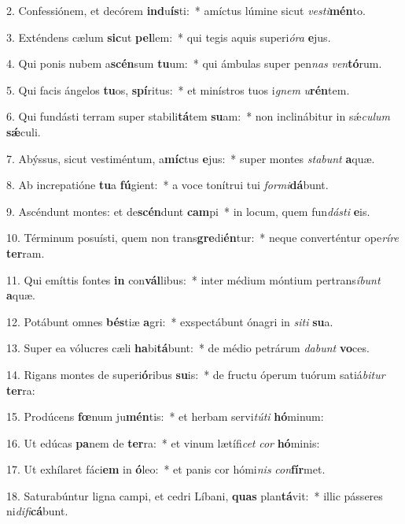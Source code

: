 2. Confessiónem, et decórem \textbf{ind}u\textbf{ís}ti:~*  amíctus lúmine sicut \textit{ves}\textit{ti}\textbf{mén}to.\

3. Exténdens cælum \textbf{sic}ut \textbf{pel}lem:~*  qui tegis aquis superi\textit{ó}\textit{ra} \textbf{e}jus.\

4. Qui ponis nubem a\textbf{scén}sum \textbf{tu}um:~*  qui ámbulas super pen\textit{nas} \textit{ven}\textbf{tó}rum.\

5. Qui facis ángelos \textbf{tu}os, \textbf{spí}ritus:~*  et minístros tuos i\textit{gnem} \textit{u}\textbf{rén}tem.\

6. Qui fundásti terram super stabili\textbf{tá}tem \textbf{su}am:~*  non inclinábitur in sǽ\textit{cu}\textit{lum} \textbf{sǽ}culi.\

7. Abýssus, sicut vestiméntum, a\textbf{míc}tus \textbf{e}jus:~*  super montes \textit{sta}\textit{bunt} \textbf{a}quæ.\

8. Ab increpatióne \textbf{tu}a \textbf{fú}gient:~*  a voce tonítrui tui \textit{for}\textit{mi}\textbf{dá}bunt.\

9. Ascéndunt montes: et de\textbf{scén}dunt \textbf{cam}pi~*  in locum, quem fun\textit{dás}\textit{ti} \textbf{e}is.\

10. Términum posuísti, quem non trans\textbf{gre}di\textbf{én}tur:~*  neque converténtur ope\textit{rí}\textit{re} \textbf{ter}ram.\

11. Qui emíttis fontes \textbf{in} con\textbf{vál}libus:~*  inter médium móntium pertrans\textit{í}\textit{bunt} \textbf{a}quæ.\

12. Potábunt omnes \textbf{bés}tiæ \textbf{a}gri:~*  exspectábunt ónagri in \textit{si}\textit{ti} \textbf{su}a.\

13. Super ea vólucres cæli \textbf{ha}bi\textbf{tá}bunt:~*  de médio petrárum \textit{da}\textit{bunt} \textbf{vo}ces.\

14. Rigans montes de superi\textbf{ó}ribus \textbf{su}is:~*  de fructu óperum tuórum satiá\textit{bi}\textit{tur} \textbf{ter}ra:\

15. Prodúcens \textbf{fœ}num ju\textbf{mén}tis:~*  et herbam servi\textit{tú}\textit{ti} \textbf{hó}minum:\

16. Ut edúcas \textbf{pa}nem de \textbf{ter}ra:~*  et vinum lætífi\textit{cet} \textit{cor} \textbf{hó}minis:\

17. Ut exhílaret fáci\textbf{em} in \textbf{ó}leo:~*  et panis cor hómi\textit{nis} \textit{con}\textbf{fír}met.\

18. Saturabúntur ligna campi, et cedri Líbani, \textbf{quas} plan\textbf{tá}vit:~*  illic pásseres ni\textit{di}\textit{fi}\textbf{cá}bunt.\

